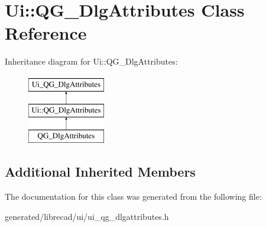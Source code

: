 \hypertarget{classUi_1_1QG__DlgAttributes}{\section{Ui\-:\-:Q\-G\-\_\-\-Dlg\-Attributes Class Reference}
\label{classUi_1_1QG__DlgAttributes}
}
Inheritance diagram for Ui\-:\-:Q\-G\-\_\-\-Dlg\-Attributes\-:\begin{figure}[H]
\begin{center}
\leavevmode
\includegraphics[height=3.000000cm]{classUi_1_1QG__DlgAttributes}
\end{center}
\end{figure}
\subsection*{Additional Inherited Members}


The documentation for this class was generated from the following file\-:\begin{DoxyCompactItemize}
\item 
generated/librecad/ui/ui\-\_\-qg\-\_\-dlgattributes.\-h\end{DoxyCompactItemize}

